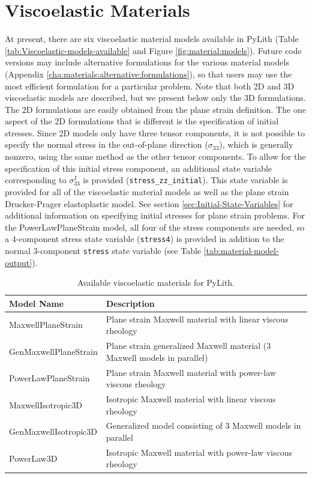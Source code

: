 \section{\label{sec:materials:viscoelastic}Viscoelastic Materials}

At present, there are six viscoelastic material models available in
PyLith (Table \vref{tab:Viscoelastic-models-available} and Figure
\vref{fig:material:models}). Future code versions may include alternative
formulations for the various material models (Appendix \vref{cha:materials:alternative:formulations}),
so that users may use the most efficient formulation for a particular
problem. Note that both 2D and 3D viscoelastic models are described,
but we present below only the 3D formulations. The 2D formulations
are easily obtained from the plane strain definition. The one aspect
of the 2D formulations that is different is the specification of initial
stresses. Since 2D models only have three tensor components, it is
not possible to specify the normal stress in the out-of-plane direction
($\sigma_{33}$), which is generally nonzero, using the same method
as the other tensor components. To allow for the specification of
this initial stress component, an additional state variable corresponding
to $\sigma_{33}^{I}$ is provided (\texttt{stress\_zz\_initial}).
This state variable is provided for all of the viscoelastic material
models as well as the plane strain Drucker-Prager elastoplastic model.
See section \vref{sec:Initial-State-Variables} for additional information
on specifying initial stresses for plane strain problems. For the
PowerLawPlaneStrain model, all four of the stress components are needed,
so a 4-component stress state variable (\texttt{stress4}) is provided
in addition to the normal 3-component \texttt{stress} state variable
(see Table \vref{tab:material-model-output}).

\noindent \begin{center}
\begin{table}[H]
\noindent \centering{}\caption{\label{tab:Viscoelastic-models-available}Available viscoelastic materials
for PyLith.}
\begin{tabular}{|>{\raggedright}p{2.85in}|>{\centering}p{2.47in}|}
\hline 
\textbf{Model Name} & \textbf{Description}\tabularnewline
\hline 
\hline 
MaxwellPlaneStrain & Plane strain Maxwell material with linear viscous rheology\tabularnewline
\hline 
GenMaxwellPlaneStrain & Plane strain generalized Maxwell material (3 Maxwell models in parallel)\tabularnewline
\hline 
PowerLawPlaneStrain & Plane strain Maxwell material with power-law viscous rheology\tabularnewline
\hline 
MaxwellIsotropic3D & Isotropic Maxwell material with linear viscous rheology\tabularnewline
\hline 
GenMaxwellIsotropic3D & Generalized model consisting of 3 Maxwell models in parallel\tabularnewline
\hline 
PowerLaw3D & Isotropic Maxwell material with power-law viscous rheology\tabularnewline
\hline 
\end{tabular}
\end{table}

\par\end{center}

